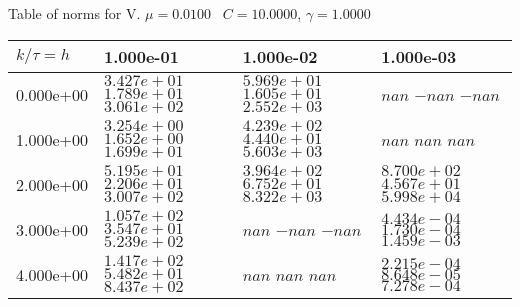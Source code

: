 \begin{center}
Table of norms for V. $\mu = 0.0100$ \, $C = 10.0000$, $\gamma = 1.0000$
  
\begin{tabular}{|p{1in}|p{1in}|p{1in}|p{1in}|} \hline
$k / \tau = h$ &1.000e-01 &1.000e-02 &1.000e-03 \\ \hline 
0.000e+00 & $3.427e+01$  $1.789e+01$  $3.061e+02$  & $5.969e+01$  $1.605e+01$  $2.552e+03$  & $nan$  $-nan$  $-nan$  \\ \hline 
1.000e+00 & $3.254e+00$  $1.652e+00$  $1.699e+01$  & $4.239e+02$  $4.440e+01$  $5.603e+03$  & $nan$  $nan$  $nan$  \\ \hline 
2.000e+00 & $5.195e+01$  $2.206e+01$  $3.007e+02$  & $3.964e+02$  $6.752e+01$  $8.322e+03$  & $8.700e+02$  $4.567e+01$  $5.998e+04$  \\ \hline 
3.000e+00 & $1.057e+02$  $3.547e+01$  $5.239e+02$  & $nan$  $-nan$  $-nan$  & $4.434e-04$  $1.730e-04$  $1.459e-03$  \\ \hline 
4.000e+00 & $1.417e+02$  $5.482e+01$  $8.437e+02$  & $nan$  $nan$  $nan$  & $2.215e-04$  $8.648e-05$  $7.278e-04$  \\ \hline 

\end{tabular}\\[20pt]
\end{center}

